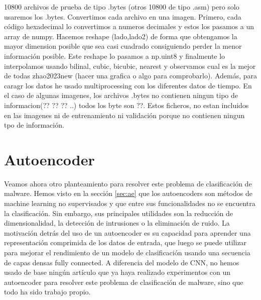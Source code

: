 10800 archivos de prueba de tipo .bytes (otros 10800 de tipo .asm) pero solo usaremos los .bytes. Convertimos cada archivo en una imagen. Primero, cada código hexadecimal lo convertimos a numeros decimales y estos los pasamos a un array de numpy. Hacemos reshape (lado,lado2) de forma que obtengamos la mayor dimension posible que sea casi cuadrado consiguiendo perder la menor información posible. Este reshape lo pasamos a np.uint8 y finalmente lo interpolamos usando bilinal, cubic, bicubic, nearest y observamos cual es la mejor de todas {zhao2023new} (hacer una grafica o algo para comprobarlo). Además, para caragr los datos he usado multiprocessing con los diferentes datos de tiempo. En el caso de algunas imagenes, los archivos .bytes no contienen ningun tipo de informacion(?? ?? ?? ..) todos los byte son ??. Estos ficheros, no estan incluidos en las imagenes ni de entrenamiento ni validación porque no contienen ningun tpo de información. 



\section{Autoencoder} \label{sec: 3.AE}

Veamos ahora otro planteamiento para resolver este problema de clasificación de malware. Hemos visto en la sección \ref{sec:ae} que los autoencoders son métodos de machine learning no supervisados y que entre sus funcionalidades no se encuentra la clasificación. Sin embargo, sus principales utilidades son la reducción de dimensionalidad, la detección de intrusiones o la eliminación de ruido. La motivación detrás del uso de un autoencoder es su capacidad para aprender una representación comprimida de los datos de entrada, que luego se puede utilizar para mejorar el rendimiento de un modelo de clasificación usando una secuencia de capas densas fully connected. A diferencia del modelo de CNN, no hemos usado de base ningún artículo que ya haya realizado experimentos con un autoencoder para resolver este problema de clasificación de malware, sino que todo ha sido trabajo propio. 


